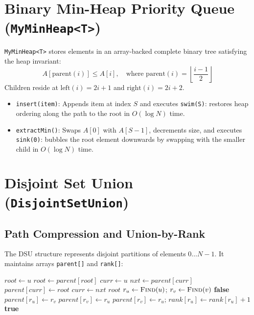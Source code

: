 \section{Binary Min-Heap Priority Queue (\texttt{MyMinHeap<T>})}
\texttt{MyMinHeap<T>} stores elements in an array-backed complete binary tree satisfying the heap invariant:
\begin{equation}
A[\text{parent}(i)] \le A[i], \quad \text{where } \text{parent}(i) = \left\lfloor \frac{i - 1}{2} \right\rfloor
\end{equation}
Children reside at $\text{left}(i) = 2i + 1$ and $\text{right}(i) = 2i + 2$.
\begin{itemize}
    \item \texttt{insert(item)}: Appends item at index $S$ and executes \texttt{swim(S)}: restores heap ordering along the path to the root in $O(\log N)$ time.
    \item \texttt{extractMin()}: Swaps $A[0]$ with $A[S-1]$, decrements size, and executes \texttt{sink(0)}: bubbles the root element downwards by swapping with the smaller child in $O(\log N)$ time.
\end{itemize}

\section{Disjoint Set Union (\texttt{DisjointSetUnion})}
\subsection{Path Compression and Union-by-Rank}
The DSU structure represents disjoint partitions of elements $0 \dots N-1$. It maintains arrays \texttt{parent[]} and \texttt{rank[]}:
\begin{algorithm}[H]
\caption{Disjoint Set Union with Path Compression and Union-by-Rank}
\begin{algorithmic}[1]
    \State $root \gets u$
        \State $root \gets parent[root]$
    \EndWhile
    \State $curr \gets u$ 
        \State $nxt \gets parent[curr]$
        \State $parent[curr] \gets root$
        \State $curr \gets nxt$
    \EndWhile
    \State \Return $root$
\EndFunction
{}
    \State $r_u \gets \Call{Find}{u}$; \quad $r_v \gets \Call{Find}{v}$
     \Return \textbf{false} \EndIf
        \State $parent[r_u] \gets r_v$
        \State $parent[r_v] \gets r_u$
    \Else
        \State $parent[r_v] \gets r_u$; \quad $rank[r_u] \gets rank[r_u] + 1$
    \EndIf
    \State \Return \textbf{true}
\EndFunction
\end{algorithmic}
\end{algorithm}

